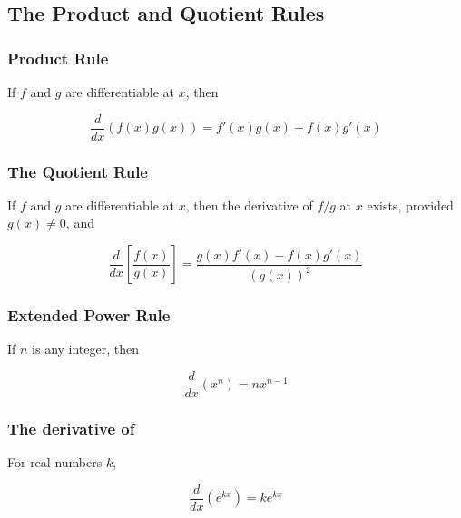 %
%
%

\subsection{The Product and Quotient Rules}
\subsubsection{Product Rule}
If $f$ and $g$ are differentiable at $x$, then

\begin{equation}
    \frac{d}{dx}(f(x) g(x)) = f'(x)g(x) + f(x)g'(x)
\end{equation}

\subsubsection{The Quotient Rule}
If $f$ and $g$ are differentiable at $x$, then the derivative of $f/g$ at $x$ exists, provided $g(x) \neq 0$, and

\begin{equation}
    \frac{d}{dx} \left[ \frac{f(x)}{g(x)} \right] = \frac{g(x)f'(x) - f(x)g'(x)}{{(g(x))}^2} 
\end{equation}

\subsubsection{Extended Power Rule}
If $n$ is any integer, then

\begin{equation}
    \frac{d}{dx} (x^n) = nx^{n-1}
\end{equation}

\subsubsection{The derivative of}
For real numbers $k$,

\begin{equation}
    \frac{d}{dx} (e^{kx}) = ke^{kx}
\end{equation}
